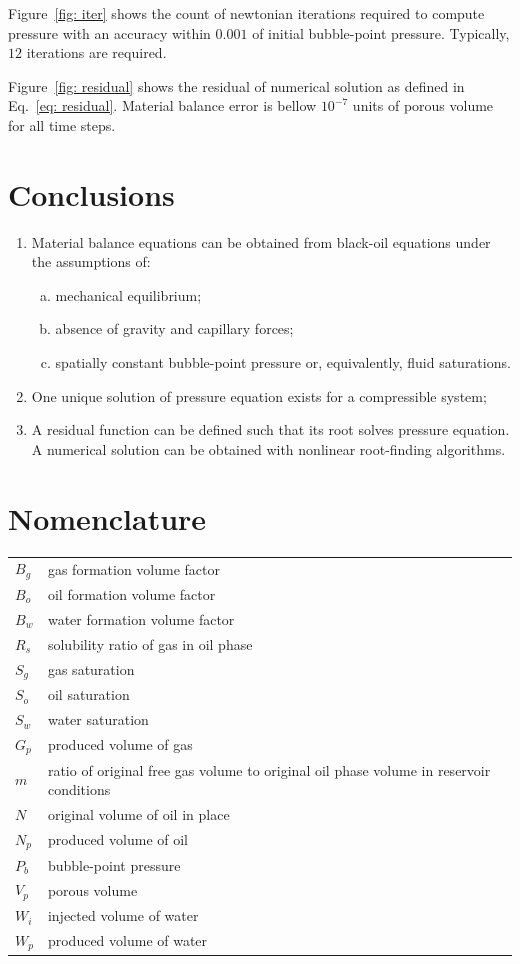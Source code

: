 \documentclass[authoryear,preprint,review,12pt]{elsarticle}
\begin{document}
Figure~\ref{fig: iter} shows the count of newtonian iterations required to compute pressure with an accuracy within $0.001$ of initial bubble-point pressure. Typically, $12$ iterations are required.

Figure~\ref{fig: residual} shows the residual of numerical solution as defined in Eq.~\eqref{eq: residual}. Material balance error is bellow $10^{-7}$ units of porous volume for all time steps.



\section{Conclusions}
\begin{enumerate}[1.]
\item Material balance equations can be obtained from black-oil equations under the assumptions of:
\begin{enumerate}[(a)]
\item mechanical equilibrium;
\item absence of gravity and capillary forces;
\item spatially constant bubble-point pressure or, equivalently, fluid saturations.
\end{enumerate}
\item One unique solution of pressure equation exists for a compressible system;
\item A residual function can be defined such that its root solves pressure equation. A numerical solution can be obtained with nonlinear root-finding algorithms.
\end{enumerate}

\section*{Nomenclature}
\begin{tabular}{ll}
$B_g$ & gas formation volume factor\\
$B_o$ & oil formation volume factor\\
$B_w$ & water formation volume factor\\
$R_s$ & solubility ratio of gas in oil phase\\
$S_g$ & gas saturation \\
$S_o$ & oil saturation \\
$S_w$ & water saturation \\
$G_p$ & produced volume of gas \\
$m$ & ratio of original free gas volume to original oil phase volume in reservoir conditions \\
$N$ & original volume of oil in place \\
$N_p$ & produced volume of oil \\
$P_b$ & bubble-point pressure \\
$V_p$ & porous volume \\
$W_i$ & injected volume of water \\
$W_p$ & produced volume of water
\end{tabular}
\end{document}
